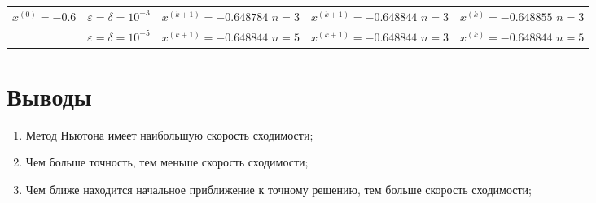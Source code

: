 \begin{table}[h!]
\begin{tabular}{|p{12ex}|l|p{20ex}|p{20ex}|p{20ex}|}
		\(x^{(0)} = -0.6\)                        &                                                                                                               %
		\(\varepsilon = \delta = 10^{-3} \)       &                                                                                                               %
		\(x^{(k+1)}=-0.648784\) \newline \(n=3 \) &                                                                                                               %
		\(x^{(k+1)}=-0.648844\) \newline \(n=3 \) &                                                                                                               %
		\(x^{(k)}=-0.648855\) \newline \(n=3 \)                                                                                                                   \\ \cline{2-5}
		                                          & \(\varepsilon = \delta = 10^{-5} \) &                                                                         %
		\(x^{(k+1)}=-0.648844\) \newline \(n=5\)  &                                                                                                               %
		\(x^{(k+1)}=-0.648844\) \newline \(n=3 \) &                                                                                                               %
		\(x^{(k)}=-0.648844\) \newline \(n=5 \)                                                                                                                   \\ \hline
	\end{tabular}
\end{table}

\section{Выводы}
\begin{enumerate}
	\item Метод Ньютона имеет наибольшую скорость сходимости;
	\item Чем больше точность, тем меньше скорость сходимости;
	\item Чем ближе находится начальное приближение к точному решению, тем больше скорость сходимости;
\end{enumerate}
